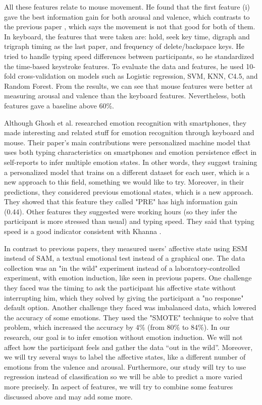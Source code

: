 \documentclass[../main.tex]{subfiles}
\begin{document}
All these features relate to mouse movement. He found that the first feature (i) gave the 
best information gain for both arousal and valence, which contrasts to the previous paper \cite{An_Evaluation_Of_Mouse_And_Keyboard_Interaction}, 
which says the movement is not that good for both of them. 
In keyboard, the features that were taken are: hold, seek key time, digraph and trigraph timing as 
the last paper, and frequency of delete/backspace keys. He tried to handle typing speed differences 
between participants, so he standardized the time-based keystroke features. 
To evaluate the data and features, he used 10-fold cross-validation on models such as 
Logistic regression, SVM, KNN, C4.5, and Random Forest. 
From the results, we can see that mouse features were better at measuring arousal and valence 
than the keyboard features. Nevertheless, both features gave a baseline above 60\%.
\par

Although Ghosh et al. \cite{Ghosh} researched emotion recognition with smartphones, 
they made interesting and related stuff for emotion recognition through keyboard and mouse. 
Their paper's main contributions were personalized machine model that uses both typing 
characteristics on smartphones and emotion persistence effect in self-reports to infer 
multiple emotion states. In other words, they suggest training a personalized model that 
trains on a different dataset for each user, which is a new approach to this field, 
something we would like to try. Moreover, in their predictions, they considered previous 
emotional states, which is a new approach. They showed that this feature they called "PRE" has 
high information gain (0.44). Other features they suggested were working hours 
(so they infer the participant is more stressed than usual) and typing speed. 
They said that typing speed is a good indicator consistent with Khanna \cite{Khanna}.
\par

In contrast to previous papers, they measured users' affective state using ESM instead of SAM, 
a textual emotional test instead of a graphical one. The data collection was an "in the wild" 
experiment instead of a laboratory-controlled experiment, with emotion induction, like seen in 
previous papers. One challenge they faced was the timing to ask the participant his affective 
state without interrupting him, which they solved by giving the participant a "no response" 
default option. Another challenge they faced was imbalanced data, which lowered the accuracy of 
some emotions. They used the "SMOTE" technique to solve that problem, which increased the 
accuracy by 4\% (from 80\% to 84\%).
In our research, our goal is to infer emotion without emotion induction. We will not affect how the participant feels and gather the data “out in the wild”. Moreover, we will try several ways to label the affective states, like a different number of emotions from the valence and arousal. Furthermore, our study will try to use regression instead of classification so we will be able to predict a more varied  more precisely. In aspect of features, we will try to combine some features discussed above and may add some more.
\end{document}
